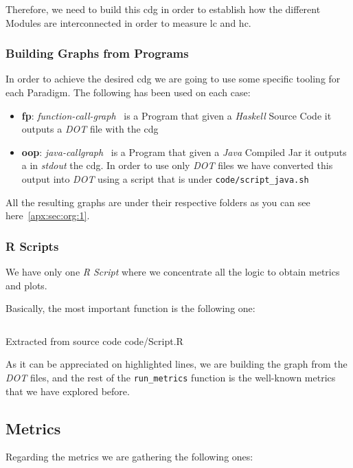 \documentclass[12pt, a4paper]{article}
\begin{document}
Therefore, we need to build this \acrlong{cdg} in order to establish how the different Modules are interconnected in order to measure \acrshort{lc} and \acrshort{hc}.

\subsubsection{Building Graphs from Programs}
In order to achieve the desired \acrlong{cdg} we are going to use some specific tooling for each Paradigm.
The following has been used on each case:

\begin{itemize}
    \item \textbf{\acrlong{fp}}: \textit{function-call-graph}~\cite{fp_callgraph} is a Program that given a \textit{Haskell} Source Code it outputs a \textit{DOT} file with the \acrlong{cdg}
    \item \textbf{\acrlong{oop}}: \textit{java-callgraph}~\cite{java_callgraph} is a Program that given a \textit{Java} Compiled Jar it outputs a in \textit{stdout} the \acrlong{cdg}. In order to use only \textit{DOT} files we have converted this output into \textit{DOT} using a script that is under \texttt{code/script_java.sh}
\end{itemize}

All the resulting graphs are under their respective folders as you can see here~\ref{apx:sec:org:1}.

\subsubsection{R Scripts}
We have only one \textit{R Script} where we concentrate all the logic to obtain metrics and plots. 

Basically, the most important function is the following one:

\begin{listing}[H]
    \inputminted[firstline=18, lastline=46, breaklines, highlightlines={19-23}]{R}{../code/Solution.R}
    \caption{Extracted from source code code/Script.R}
    \label{src:script:1}
\end{listing}
  
As it can be appreciated on highlighted lines, we are building the graph from the \textit{DOT} files, 
and the rest of the \texttt{run_metrics} function is the well-known metrics that we have explored before.   

\subsection{Metrics}
Regarding the metrics we are gathering the following ones:
\end{document}
